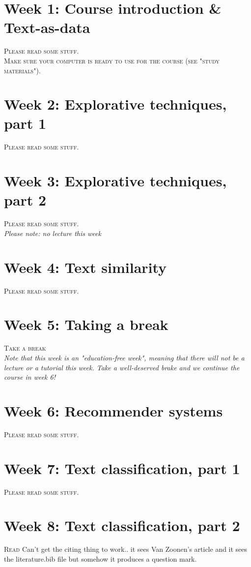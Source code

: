 



\section*{Week 1: Course introduction \& Text-as-data}
\textsc{ Please read some stuff.}\\
\textsc{ Make sure your computer is ready to use for the course (see "study materials").}\\

\section*{Week 2: Explorative techniques, part 1}
\textsc{ Please read some stuff.}\\

\section*{Week 3: Explorative techniques, part 2}
\textsc{ Please read some stuff.}\\

\emph{Please note: no lecture this week}

\section*{Week 4: Text similarity}
\textsc{ Please read some stuff.}\\


\section*{Week 5: Taking a break}
\textsc{ Take a break}\\

\emph{Note that this week is an "education-free week", meaning that there will not be a lecture or a tutorial this week. Take a well-deserved brake and we continue the course in week 6!}

\section*{Week 6: Recommender systems}
\textsc{ Please read some stuff.}\\


\section*{Week 7: Text classification, part 1}
\textsc{ Please read some stuff.}\\


\section*{Week 8: Text classification, part 2}
\textsc{ Read \cite{van_zoonen_social_2016}}
Can't get the citing thing to work.. it sees Van Zoonen's article and it sees the literature.bib file but somehow it produces a question mark.


